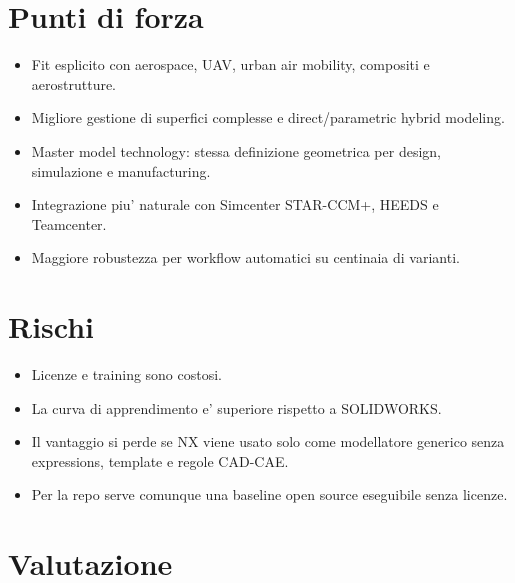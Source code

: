 \section{Punti di forza}

\begin{itemize}
    \item Fit esplicito con aerospace, UAV, urban air mobility, compositi e aerostrutture.
    \item Migliore gestione di superfici complesse e direct/parametric hybrid modeling.
    \item Master model technology: stessa definizione geometrica per design, simulazione e manufacturing.
    \item Integrazione piu' naturale con Simcenter STAR-CCM+, HEEDS e Teamcenter.
    \item Maggiore robustezza per workflow automatici su centinaia di varianti.
\end{itemize}

\section{Rischi}

\begin{itemize}
    \item Licenze e training sono costosi.
    \item La curva di apprendimento e' superiore rispetto a SOLIDWORKS.
    \item Il vantaggio si perde se NX viene usato solo come modellatore generico senza expressions, template e regole CAD-CAE.
    \item Per la repo serve comunque una baseline open source eseguibile senza licenze.
\end{itemize}

\section{Valutazione}

